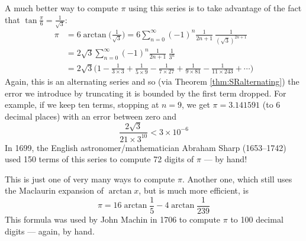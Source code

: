 \begin{eg}
A much better way to compute $\pi$ using this series is to take
advantage of the fact that $\tan\frac{\pi}{6}=\frac{1}{\sqrt{3}}$:
\begin{align*}
\pi&= 6\arctan\Big(\frac{1}{\sqrt{3}}\Big)
= 6\sum_{n=0}^\infty (-1)^n\frac{1}{2n+1}\ \frac{1}{{(\sqrt{3})}^{2n+1}} \\
&= 2\sqrt{3} \sum_{n=0}^\infty (-1)^n\frac{1}{2n+1}\ \frac{1}{3^n} \\
&=2\sqrt{3}\Big(1-\frac{1}{3\times 3}+\frac{1}{5\times 9}-\frac{1}{7\times 27}
+\frac{1}{9\times 81}-\frac{1}{11\times 243}+\cdots\Big)
\end{align*}
Again, this is an alternating series and so (via Theorem \ref{thm:SRalternating}) the error we introduce by
truncating it is bounded by the first term dropped. For example,
if we keep ten terms, stopping at $n=9$, we get $\pi=3.141591$
(to 6 decimal places) with an error between zero and
\begin{equation*}
\frac{2\sqrt{3}}{21\times 3^{10}}<3\times 10^{-6}
\end{equation*}
In 1699, the English astronomer/mathematician
Abraham Sharp (1653--1742) used 150 terms of this series to compute 72 digits of $\pi$ --- by hand!

This is just one of very many ways to compute $\pi$. Another one, which still uses the Maclaurin expansion of $\arctan x$, but is much
more efficient, is
\begin{equation*}
\pi= 16\arctan\frac{1}{5}-4\arctan\frac{1}{239}
\end{equation*}
This formula was used by John Machin in 1706 to compute $\pi$ to 100 decimal digits --- again, by hand.
\end{eg}


